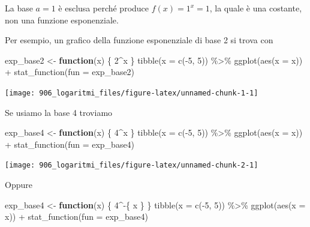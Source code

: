 \documentclass[
]{memoir}
\newenvironment{Shaded}{\begin{snugshade}}{\end{snugshade}}
\newcommand{\AttributeTok}[1]{\textcolor[rgb]{0.77,0.63,0.00}{#1}}
\newcommand{\ControlFlowTok}[1]{\textcolor[rgb]{0.13,0.29,0.53}{\textbf{#1}}}
\newcommand{\DecValTok}[1]{\textcolor[rgb]{0.00,0.00,0.81}{#1}}
\newcommand{\FunctionTok}[1]{\textcolor[rgb]{0.00,0.00,0.00}{#1}}
\newcommand{\NormalTok}[1]{#1}
\newcommand{\OtherTok}[1]{\textcolor[rgb]{0.56,0.35,0.01}{#1}}
\newcommand{\SpecialCharTok}[1]{\textcolor[rgb]{0.00,0.00,0.00}{#1}}
\theoremstyle{definition}
\theoremstyle{definition}
\theoremstyle{definition}
\theoremstyle{definition}
\theoremstyle{remark}
\begin{document}
La base \(a = 1\) è esclusa perché produce \(f(x) = 1^x = 1\), la quale è una costante, non una funzione esponenziale.

Per esempio, un grafico della funzione esponenziale di base 2 si trova con

\begin{Shaded}
\begin{Highlighting}[]
\NormalTok{exp\_base2 }\OtherTok{\textless{}{-}} \ControlFlowTok{function}\NormalTok{(x) \{}
  \DecValTok{2}\SpecialCharTok{\^{}}\NormalTok{x}
\NormalTok{\}}
\FunctionTok{tibble}\NormalTok{(}\AttributeTok{x =} \FunctionTok{c}\NormalTok{(}\SpecialCharTok{{-}}\DecValTok{5}\NormalTok{, }\DecValTok{5}\NormalTok{)) }\SpecialCharTok{\%\textgreater{}\%}
  \FunctionTok{ggplot}\NormalTok{(}\FunctionTok{aes}\NormalTok{(}\AttributeTok{x =}\NormalTok{ x)) }\SpecialCharTok{+}
  \FunctionTok{stat\_function}\NormalTok{(}\AttributeTok{fun =}\NormalTok{ exp\_base2)}
\end{Highlighting}
\end{Shaded}

\begin{center}\texttt{[image: 906\_logaritmi\_files/figure-latex/unnamed-chunk-1-1]} \end{center}

Se usiamo la base 4 troviamo

\begin{Shaded}
\begin{Highlighting}[]
\NormalTok{exp\_base4 }\OtherTok{\textless{}{-}} \ControlFlowTok{function}\NormalTok{(x) \{}
  \DecValTok{4}\SpecialCharTok{\^{}}\NormalTok{x}
\NormalTok{\}}
\FunctionTok{tibble}\NormalTok{(}\AttributeTok{x =} \FunctionTok{c}\NormalTok{(}\SpecialCharTok{{-}}\DecValTok{5}\NormalTok{, }\DecValTok{5}\NormalTok{)) }\SpecialCharTok{\%\textgreater{}\%}
  \FunctionTok{ggplot}\NormalTok{(}\FunctionTok{aes}\NormalTok{(}\AttributeTok{x =}\NormalTok{ x)) }\SpecialCharTok{+}
  \FunctionTok{stat\_function}\NormalTok{(}\AttributeTok{fun =}\NormalTok{ exp\_base4)}
\end{Highlighting}
\end{Shaded}

\begin{center}\texttt{[image: 906\_logaritmi\_files/figure-latex/unnamed-chunk-2-1]} \end{center}

Oppure

\begin{Shaded}
\begin{Highlighting}[]
\NormalTok{exp\_base4 }\OtherTok{\textless{}{-}} \ControlFlowTok{function}\NormalTok{(x) \{}
  \DecValTok{4}\SpecialCharTok{\^{}{-}}\NormalTok{\{}
\NormalTok{    x}
\NormalTok{  \}}
\NormalTok{\}}
\FunctionTok{tibble}\NormalTok{(}\AttributeTok{x =} \FunctionTok{c}\NormalTok{(}\SpecialCharTok{{-}}\DecValTok{5}\NormalTok{, }\DecValTok{5}\NormalTok{)) }\SpecialCharTok{\%\textgreater{}\%}
  \FunctionTok{ggplot}\NormalTok{(}\FunctionTok{aes}\NormalTok{(}\AttributeTok{x =}\NormalTok{ x)) }\SpecialCharTok{+}
  \FunctionTok{stat\_function}\NormalTok{(}\AttributeTok{fun =}\NormalTok{ exp\_base4)}
\end{Highlighting}
\end{Shaded}
\end{document}
